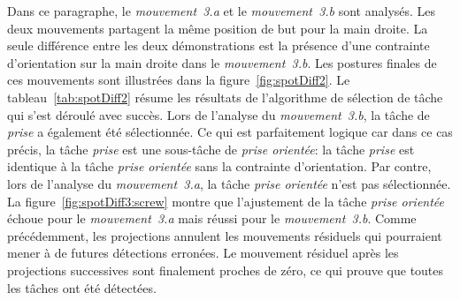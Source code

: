 Dans ce paragraphe, le \emph{mouvement~3.a} et le \emph{mouvement~3.b} sont analysés.
Les deux mouvements partagent la même position de but pour la main droite.
La seule différence entre les deux démonstrations est la présence d'une contrainte 
d'orientation sur la main droite dans le \emph{mouvement~3.b}.
Les postures finales de ces mouvements sont illustrées dans la figure~\ref{fig:spotDiff2}.
Le tableau~\ref{tab:spotDiff2} résume les résultats de l'algorithme de sélection de t\^ache
qui s'est déroulé avec succès.
Lors de l'analyse du \emph{mouvement~3.b}, la t\^ache de \emph{prise} a également
été sélectionnée. Ce qui est parfaitement logique car dans ce cas précis,
la t\^ache \emph{prise} est une sous-t\^ache de \emph{prise orientée}: la t\^ache \emph{prise}
est identique à la t\^ache \emph{prise orientée} sans la contrainte d'orientation.
Par contre, lors de l'analyse du \emph{mouvement~3.a}, la t\^ache
\emph{prise orientée} n'est pas sélectionnée.
La figure~\ref{fig:spotDiff3:screw} montre que l'ajustement de la t\^ache
\emph{prise orientée} échoue pour le \emph{mouvement~3.a} mais 
réussi pour le \emph{mouvement~3.b}.
Comme précédemment,
les projections annulent les mouvements résiduels qui pourraient mener à de futures détections erronées.
Le mouvement résiduel après les projections successives sont finalement proches de zéro, ce qui 
prouve que toutes les t\^aches ont été détectées.

